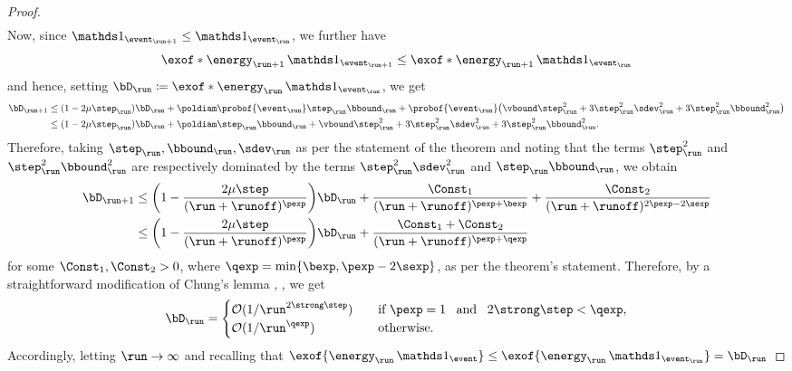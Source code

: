 \begin{proof}
\begin{align}
\end{align}
Now, since $\one_{\event_{\run+1}} \leq \one_{\event_{\run}}$, we further have
\begin{equation}
\exof*{\next[\energy]\one_{\event_{\run+1}}}
	\leq \exof*{\next[\energy]\one_{\event_{\run}}}
\end{equation}
and hence, setting $\bD_{\run} \defeq \exof*{\curr[\energy]\one_{\event_{\run}}}$, we get
\begin{align}
\next[\bD]
	&\leq (1-2\mu\step_{\run}) \curr[\bD]
		+ \poldiam \probof{\event_{\run}} \step_{\run} \bbound_{\run}
		+ \probof{\event_{\run}}
			\parens*{\vbound \step_{\run}^{2} + 3\step_{\run}^{2} \sdev_{\run}^{2} + 3 \step_{\run}^{2}\bbound_{\run}^{2}}
	\notag\\
	&\leq (1-2\mu\step_{\run}) \curr[\bD]
		+ \poldiam\step_{\run}\bbound_{\run}
		+ \vbound \step_{\run}^{2}
		+ 3\step_{\run}^{2} \sdev_{\run}^{2}
		+ 3 \step_{\run}^{2}\bbound_{\run}^{2}.
\end{align}
Therefore, taking $\step_{\run}, \bbound_{\run},\sdev_{\run}$ as per the statement of the theorem and noting that the terms $\step_{\run}^{2}$ and $\step_{\run}^{2} \bbound_{\run}^{2}$ are respectively dominated by the terms $\step_{\run}^{2}\sdev_{\run}^{2}$ and $\step_{\run} \bbound_{\run}$, we obtain
\begin{align}
	\next[\bD]
	&\leq \parens*{1-\frac{2\mu\step}{(\run + \runoff)^\pexp}} \curr[\bD]
		+ \frac{\Const_{1}}{(\run+\runoff)^{\pexp+\bexp}}
		+ \frac{\Const_{2}}{(\run+\runoff)^{2\pexp-2\sexp}}
	\notag\\
	&\leq \parens*{1-\frac{2\mu\step}{(\run + \runoff)^\pexp}}\curr[\bD] + \frac{\Const_{1} + \Const_{2}}{(\run+\runoff)^{\pexp+\qexp}}
\end{align}
for some $\Const_{1}, \Const_{2} >0$, where $\qexp = \min\{\bexp,\pexp - 2\sexp\}$, as per the theorem's statement.
Therefore, by a straightforward modification of Chung's lemma \cite[Lemmas 2\&3]{Chu54}, \cite[p.~45]{Pol87}, we get
\begin{equation}
	\bD_{\run}
	=
	\begin{cases}
	\bigoh(1/\run^{2\strong\step})
		&\quad
		\text{if $\pexp=1$ \, and \, $2\strong\step<\qexp$},
		\\
	\bigoh(1/\run^{\qexp})
		&\quad
		\text{otherwise}.
	\end{cases}
\end{equation}
Accordingly, letting $\run \to \infty$ and recalling that $\exof{\curr[\energy]\one_{\event}} \leq \exof{\curr[\energy]\one_{\event_{\run}}} = \curr[\bD]$ 

\end{proof}
